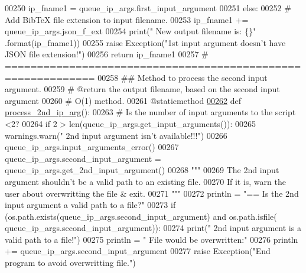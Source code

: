 \begin{DoxyCode}
00250             ip\_fname1 = queue\_ip\_args.first\_input\_argument
00251         \textcolor{keywordflow}{else}:
00252             \textcolor{comment}{#   Add BibTeX file extension to input filename.}
00253             ip\_fname1 += queue\_ip\_args.json\_f\_ext
00254             print(\textcolor{stringliteral}{" New output filename is: \{\}"} .format(ip\_fname1))
00255             \textcolor{keywordflow}{raise} Exception(\textcolor{stringliteral}{"1st input argument doesn't have JSON file extension!"})
00256         \textcolor{keywordflow}{return} ip\_fname1
00257     \textcolor{comment}{# ============================================================}
00258     \textcolor{comment}{##  Method to process the second input argument.}
00259     \textcolor{comment}{#   @return the output filename, based on the second input argument}
00260     \textcolor{comment}{#   O(1) method.}
00261     @staticmethod
\hypertarget{queue__ip__arguments_8py_source_l00262}{}\hyperlink{classutilities_1_1queue__ip__arguments_1_1queue__ip__args_a82d245379c48196f61d4268882dd5c6d}{00262}     \textcolor{keyword}{def }\hyperlink{classutilities_1_1queue__ip__arguments_1_1queue__ip__args_a82d245379c48196f61d4268882dd5c6d}{process\_2nd\_ip\_arg}():
00263         \textcolor{comment}{#   Is the number of input arguments to the script <2?}
00264         \textcolor{keywordflow}{if} 2 > len(queue\_ip\_args.get\_input\_arguments()):
00265             warnings.warn(\textcolor{stringliteral}{" 2nd input argument isn't available!!!"})
00266             queue\_ip\_args.input\_arguments\_error()
00267         queue\_ip\_args.second\_input\_argument = queue\_ip\_args.get\_2nd\_input\_argument()
00268         \textcolor{stringliteral}{"""}
00269 \textcolor{stringliteral}{        The 2nd input argument shouldn't be a valid path to an existing file.}
00270 \textcolor{stringliteral}{        If it is, warn the user about overwritting the file & exit.}
00271 \textcolor{stringliteral}{        """}
00272         println = \textcolor{stringliteral}{"==   Is the 2nd input argument a valid path to a file?"}
00273         \textcolor{keywordflow}{if} (os.path.exists(queue\_ip\_args.second\_input\_argument) \textcolor{keywordflow}{and} os.path.isfile(
      queue\_ip\_args.second\_input\_argument)):
00274             print(\textcolor{stringliteral}{" 2nd input argument is a valid path to a file!"})
00275             println = \textcolor{stringliteral}{" File would be overwritten:"}
00276             println += queue\_ip\_args.second\_input\_argument
00277             \textcolor{keywordflow}{raise} Exception(\textcolor{stringliteral}{"End program to avoid overwritting file."})

\end{DoxyCode}
